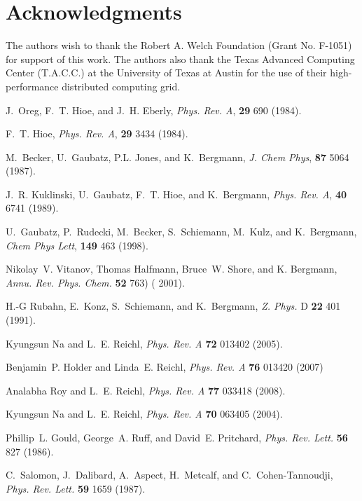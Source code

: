 \documentclass{article}
\begin{document}
\section{Acknowledgments}
%
%
The authors wish to thank the Robert A. Welch Foundation (Grant No. F-1051) for support of this work. The  authors also thank the Texas Advanced Computing Center (T.A.C.C.) at the University of Texas at Austin for the use of their high-performance distributed computing grid.

%
\begin{thebibliography}{99}

J.~Oreg, F.~T. Hioe, and J.~H. Eberly, {\em Phys. Rev. A}, {\bf 29}  690 (1984).

F.~T. Hioe,  {\em Phys. Rev. A}, {\bf  29} 3434 (1984).

M.~Becker, U.~Gaubatz, P.L. Jones, and K.~Bergmann, {\em J. Chem Phys}, {\bf 87} 5064 (1987).

J.~R. Kuklinski, U.~Gaubatz, F.~T. Hioe, and K.~Bergmann,  {\em Phys. Rev. A}, {\bf 40} 6741 (1989).

U.~Gaubatz, P.~Rudecki, M.~Becker, S.~Schiemann, M.~Kulz, and K.~Bergmann,  {\em Chem Phys Lett}, {\bf 149} 463 (1998).

Nikolay~V. Vitanov, Thomas Halfmann, Bruce~W. Shore, and K.  Bergmann,  {\em Annu. Rev. Phys. Chem.} {\bf 52} 763) ( 2001).

H.-G Rubahn, E.~Konz, S.~Schiemann, and K.~Bergmann,  {\em Z. Phys.} D {\bf 22} 401 (1991).

Kyungsun Na and L.~E. Reichl,  {\em Phys. Rev. A} {\bf 72} 013402 (2005).

Benjamin~P. Holder and Linda~E. Reichl,  {\em Phys. Rev. A} {\bf 76} 013420 (2007)

Analabha Roy and L.~E. Reichl,  {\em Phys. Rev. A } 
  {\bf 77} 033418 (2008).

Kyungsun Na and L.~E. Reichl,  {\em Phys. Rev. A} {\bf 70} 063405 (2004).

Phillip~L. Gould, George~A. Ruff, and David~E. Pritchard,  {\em Phys. Rev. Lett.} {\bf 56} 827 (1986).

C.~Salomon, J.~Dalibard, A.~Aspect, H.~Metcalf, and C.~Cohen-Tannoudji,  {\em Phys. Rev. Lett.} {\bf 59} 1659 (1987).


\end{thebibliography}
\end{document}
